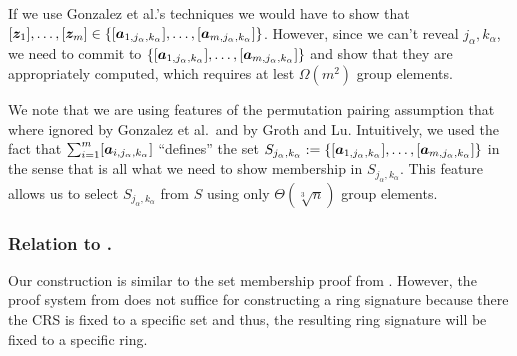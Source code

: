 If we use Gonzalez et al.'s techniques we would have to show that $[{\boldsymbol{z}}_1],\ldots,\allowbreak [{\boldsymbol{z}}_m]\in\{[{\boldsymbol{a}}_{1,j_\alpha,k_\alpha}],\ldots,[{\boldsymbol{a}}_{m,j_\alpha,k_\alpha}]\}$. However, since we can't reveal $j_\alpha,k_\alpha$, we need to commit to $\{[{\boldsymbol{a}}_{1,j_\alpha,k_\alpha}],\ldots,[{\boldsymbol{a}}_{m,j_\alpha,k_\alpha}]\}$ and show that they are appropriately computed, which requires at lest $\Omega(m^2)$ group elements.

We note that we are using features of the permutation pairing assumption that where ignored by Gonzalez et al.~and by Groth and Lu. Intuitively, we used the fact that $\sum_{i=1}^m [{\boldsymbol{a}}_{i,j_\alpha,k_\alpha}]$ ``defines'' the set $S_{j_\alpha,k_\alpha}:=\{[{\boldsymbol{a}}_{1,j_\alpha,k_\alpha}],\ldots,[{\boldsymbol{a}}_{m,j_\alpha,k_\alpha}]\}$ in the sense that is all what we need to show membership in $S_{j_\alpha,k_\alpha}$. This feature allows us to select $S_{j_\alpha,k_\alpha}$ from $S$ using only $\Theta(\sqrt[3]{n})$ group elements.



\subsubsection{Relation to \cite{AC:GonHevRaf15}.}
Our construction is similar to the set membership proof from \cite[Appendix D.2]{AC:GonHevRaf15}. However, the proof system from \cite{AC:GonHevRaf15} does not suffice for constructing a ring signature because there the CRS is fixed to a specific set and thus, the resulting ring signature will be fixed to a specific ring. 


